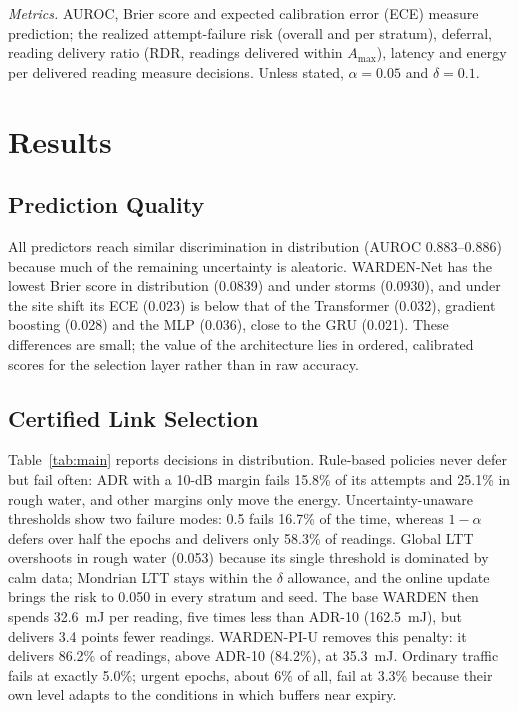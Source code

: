 \documentclass[journal]{IEEEtran}\def\WARDENieee{1}%
\begin{document}
\emph{Metrics.} AUROC, Brier score and expected calibration error (ECE) measure prediction; the realized attempt-failure risk (overall and per stratum), deferral, reading delivery ratio (RDR, readings delivered within $A_{\max}$), latency and energy per delivered reading measure decisions. Unless stated, $\alpha=0.05$ and $\delta=0.1$.

\section{Results}\label{sec:results}
\subsection{Prediction Quality}
All predictors reach similar discrimination in distribution (AUROC 0.883--0.886) because much of the remaining uncertainty is aleatoric. WARDEN-Net has the lowest Brier score in distribution (0.0839) and under storms (0.0930), and under the site shift its ECE (0.023) is below that of the Transformer (0.032), gradient boosting (0.028) and the MLP (0.036), close to the GRU (0.021). These differences are small; the value of the architecture lies in ordered, calibrated scores for the selection layer rather than in raw accuracy.

\subsection{Certified Link Selection}
Table~\ref{tab:main} reports decisions in distribution. Rule-based policies never defer but fail often: ADR with a 10-dB margin fails 15.8\% of its attempts and 25.1\% in rough water, and other margins only move the energy. Uncertainty-unaware thresholds show two failure modes: 0.5 fails 16.7\% of the time, whereas $1-\alpha$ defers over half the epochs and delivers only 58.3\% of readings. Global LTT overshoots in rough water (0.053) because its single threshold is dominated by calm data; Mondrian LTT stays within the $\delta$ allowance, and the online update brings the risk to 0.050 in every stratum and seed. The base WARDEN then spends 32.6~mJ per reading, five times less than ADR-10 (162.5~mJ), but delivers 3.4 points fewer readings. WARDEN-PI-U removes this penalty: it delivers 86.2\% of readings, above ADR-10 (84.2\%), at 35.3~mJ. Ordinary traffic fails at exactly 5.0\%; urgent epochs, about 6\% of all, fail at 3.3\% because their own level adapts to the conditions in which buffers near expiry.
\end{document}
